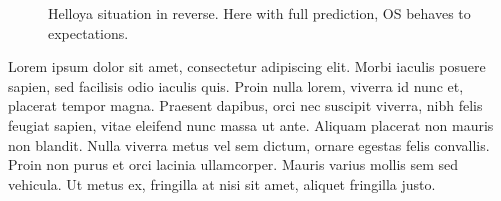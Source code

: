 \begin{figure}[ht]
\begin{subfigure}[b]{0.499\textwidth}
    \end{subfigure}
    \hfill
    \caption{Helloya situation in reverse. Here with full prediction, \gls{OS} behaves to expectations.}
\end{figure}

Lorem ipsum dolor sit amet, consectetur adipiscing elit. Morbi iaculis posuere sapien, sed facilisis odio iaculis quis. 
Proin nulla lorem, viverra id nunc et, placerat tempor magna. Praesent dapibus, orci nec suscipit viverra, nibh felis feugiat sapien, 
vitae eleifend nunc massa ut ante. Aliquam placerat non mauris non blandit. Nulla viverra metus vel sem dictum, ornare egestas felis convallis. 
Proin non purus et orci lacinia ullamcorper. Mauris varius mollis sem sed vehicula. Ut metus ex, fringilla at nisi sit amet, aliquet fringilla justo.

